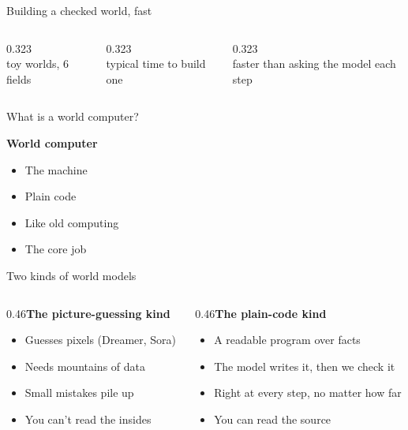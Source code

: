 \documentclass[aspectratio=169,11pt]{beamer}
\begin{document}
\begin{frame}{Building a checked world, fast}\vfill\begin{columns}[c]\begin{column}{0.323\textwidth}\\[6pt]{\color{owmuted}\small toy worlds, 6 fields}\end{column}\begin{column}{0.323\textwidth}\\[6pt]{\color{owmuted}\small typical time to build one}\end{column}\begin{column}{0.323\textwidth}\\[6pt]{\color{owmuted}\small faster than asking the model each step}\end{column}\end{columns}\vfill\end{frame}
\begin{frame}{What is a world computer?}\vfill\begin{center}{\color{owdeep}\Large\bfseries World computer}\end{center}\vskip8pt\begin{itemize}\item The machine\item Plain code\item Like old computing\item The core job\end{itemize}\vfill\end{frame}
\begin{frame}{Two kinds of world models}\vfill
\begin{columns}[T]
\begin{column}{0.46\textwidth}{\color{owmuted}\bfseries\large The picture-guessing kind}\par\medskip\begin{itemize}\small \item Guesses pixels (Dreamer, Sora)
\item Needs mountains of data
\item Small mistakes pile up
\item You can't read the insides\end{itemize}\end{column}
\begin{column}{0.46\textwidth}{\color{owteal}\bfseries\large The plain-code kind}\par\medskip\begin{itemize}\small \item A readable program over facts
\item The model writes it, then we check it
\item Right at every step, no matter how far
\item You can read the source\end{itemize}\end{column}
\end{columns}\vfill\end{frame}
\end{document}
